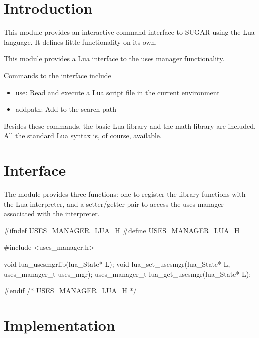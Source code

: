\section{Introduction}%

This module provides an interactive command interface to SUGAR
using the Lua language.  It defines little functionality on its
own.

This module provides a Lua interface to the {\Tt{}uses\nwendquote} manager
functionality.

Commands to the interface include
\begin{itemize}
  \item {\Tt{}use\nwendquote}:
    Read and execute a Lua script file in the current environment
  \item {\Tt{}addpath\nwendquote}: Add to the search path
\end{itemize}

Besides these commands, the basic Lua library and the math library
are included.  All the standard Lua syntax is, of course, available.


\section{Interface}

The module provides three functions: one to register the library
functions with the Lua interpreter, and a setter/getter pair to
access the uses manager associated with the interpreter.

\endmoddef\nwstartdeflinemarkup\nwenddeflinemarkup
#ifndef USES_MANAGER_LUA_H
#define USES_MANAGER_LUA_H

#include <uses_manager.h>

void lua_usesmgrlib(lua_State* L);
void lua_set_usesmgr(lua_State* L, uses_manager_t uses_mgr);
uses_manager_t lua_get_usesmgr(lua_State* L);

#endif /* USES_MANAGER_LUA_H */
\nwendcode{}\nwdocspar


\section{Implementation}

